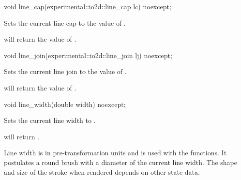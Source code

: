 \begin{itemdecl}
void line_cap(experimental::io2d::line_cap lc) noexcept;
\end{itemdecl}
\begin{itemdescr}
	\pnum
	\effects
	Sets the current line cap to the value of .
		
	\pnum
	\postconditions
	 will return the value of .
\end{itemdescr}

\begin{itemdecl}
void line_join(experimental::io2d::line_join lj) noexcept;
\end{itemdecl}
\begin{itemdescr}
	\pnum
	\effects
	Sets the current line join to the value of .
	
	\pnum
	\postconditions
	 will return the value of .
\end{itemdescr}

\begin{itemdecl}
void line_width(double width) noexcept;
\end{itemdecl}
\begin{itemdescr}
	\pnum
	\effects
	Sets the current line width to .
	
	\pnum
	\postconditions
	 will return .
	
	\pnum
	\remarks
	Line width is in pre-transformation units and is used with the  functions. It postulates a round brush with a diameter of the current line width. The shape and size of the stroke when rendered depends on other state data.
\end{itemdescr}

